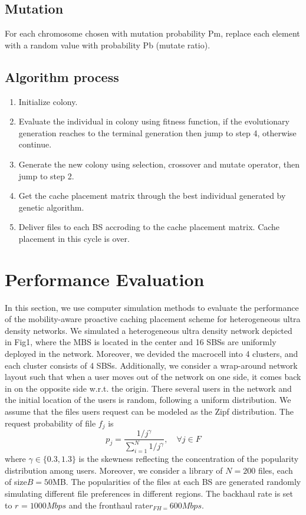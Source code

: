 \documentclass[conference]{IEEEtran}
\begin{document}
\subsection{Mutation}
For each chromosome chosen with mutation probability Pm, replace each element with a random value with probability Pb (mutate ratio).
\subsection{Algorithm process}
\begin{enumerate}[step 1]
\item Initialize colony.
\item Evaluate the individual in colony using fitness function, if the evolutionary generation reaches to the terminal generation then jump to step 4, otherwise continue.
\item Generate the new colony using selection, crossover and mutate operator, then jump to step 2.
\item Get the cache placement matrix through the best individual generated by genetic algorithm.
\item Deliver files to each BS accroding to the cache placement matrix. Cache placement in this cycle is over.
\end{enumerate}
\section{Performance Evaluation}
In this section, we use computer simulation methods to evaluate the performance of the mobility-aware proactive caching placement scheme for heterogeneous ultra density networks. We simulated a heterogeneous ultra density network depicted in Fig1, where the MBS is located in the center and 16 SBSs are uniformly deployed in the network. Moreover, we devided the macrocell into 4 clusters, and each cluster consists of 4 SBSs. Additionally, we consider a wrap-around network layout such that when a user moves out of the network on one side, it comes back in on the opposite side w.r.t. the origin. There several users in the network and the initial location of the users is random, following a uniform distribution. We assume that the files users request can be modeled as the Zipf distribution. The request probability of file $f_j$ is
$$p_j=\frac{1/j^\gamma}{\sum_{i=1}^N 1/j^\gamma}, \quad \forall j\in F$$
where $\gamma\in \{0.3,1.3\}$ is the skewness reflecting the concentration of the popularity distribution among users. Moreover, we consider a library of $N=200$ files, each of size$B=50$MB. The popularities of the files at each BS are generated randomly simulating different file preferences in different regions. The backhaul rate is set to $r_{}= 1000Mbps$ and the fronthaul rate$ r_{FH=}600Mbps$.
\end{document}
